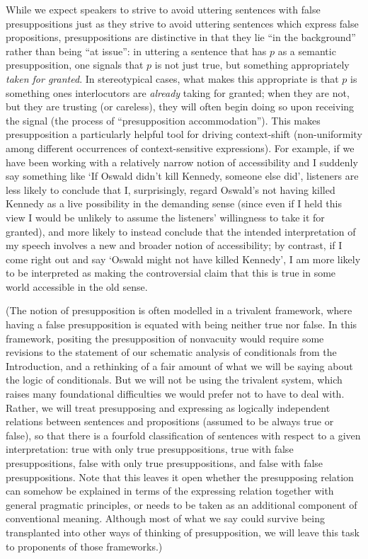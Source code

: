 \documentclass[If.tex]{subfiles}
\begin{document}
While we expect speakers to strive to avoid uttering sentences with false presuppositions just as they strive to avoid uttering sentences which express false propositions, presuppositions are distinctive in that they lie “in the background” rather than being “at issue”: in uttering a sentence that has $p$ as a semantic presupposition, one signals that $p$ is not just true, but something appropriately \emph{taken for granted}.  In stereotypical cases, what makes this appropriate is that $p$ is something ones interlocutors are \emph{already} taking for granted; when they are not, but they are trusting (or careless), they will often begin doing so upon receiving the signal (the process of “presupposition accommodation”).  This makes presupposition a particularly helpful tool for driving context-shift (non-uniformity among different occurrences of context-sensitive expressions).  For example, if we have been working with a relatively narrow notion of accessibility and I suddenly say something like ‘If Oswald didn't kill Kennedy, someone else did’, listeners are less likely to conclude that I, surprisingly, regard Oswald's not having killed Kennedy as a live possibility in the demanding sense (since even if I held this view I would be unlikely to assume the listeners' willingness to take it for granted), and more likely to instead conclude that the intended interpretation of my speech involves a new and broader notion of accessibility; by contrast, if I come right out and say ‘Oswald might not have killed Kennedy’, I am more likely to be interpreted as making the controversial claim that this is true in some world accessible in the old sense.  

(The notion of presupposition is often modelled in a trivalent framework, where having a false presupposition is equated with being neither true nor false.  In this framework, positing the presupposition of nonvacuity would require some revisions to the statement of our schematic analysis of conditionals from the Introduction, and a rethinking of a fair amount of what we will be saying about the logic of conditionals.  But we will not be using the trivalent system, which raises many foundational difficulties we would prefer not to have to deal with.  Rather, we will treat presupposing and expressing as logically independent relations between sentences and propositions (assumed to be always true or false), so that there is a fourfold classification of sentences with respect to a given interpretation: true with only true presuppositions, true with false presuppositions, false with only true presuppositions, and false with false presuppositions.  Note that this leaves it open whether the presupposing relation can somehow be explained in terms of the expressing relation together with general pragmatic principles, or needs to be taken as an additional component of conventional meaning.  Although most of what we say could survive being transplanted into other ways of thinking of presupposition, we will leave this task to proponents of those frameworks.)
\end{document}
